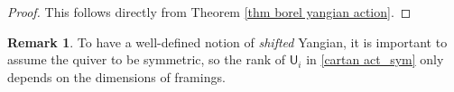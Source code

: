 \documentclass[10pt]{amsart}
\theoremstyle{definition}
\newtheorem{Remark}[Theorem]{Remark}
\newtheorem{Example}[Theorem]{Example}
\numberwithin{equation}{section}
\newcommand{\bC}{\mathbb{C}}
\newcommand{\bZ}{\mathbb{Z}}
\newcommand{\sT}{\mathsf{T}}
\newcommand{\sW}{\mathsf{W}}
\newcommand{\sw}{\mathsf{w}}
\newcommand{\Hilb}{\operatorname{Hilb}}
\newcommand{\tr}{\operatorname{tr}}
\begin{document}
\begin{proof}
This follows directly from Theorem \ref{thm borel yangian action}.
\end{proof}
\begin{Remark}\label{rmk on sm q}
To have a well-defined notion of \textit{shifted} Yangian, it is important to assume the quiver to be  symmetric, so the rank of $\mathsf U_i$ in \eqref{cartan act_sym}
only depends on the dimensions of framings. 
\end{Remark}




\end{document}
